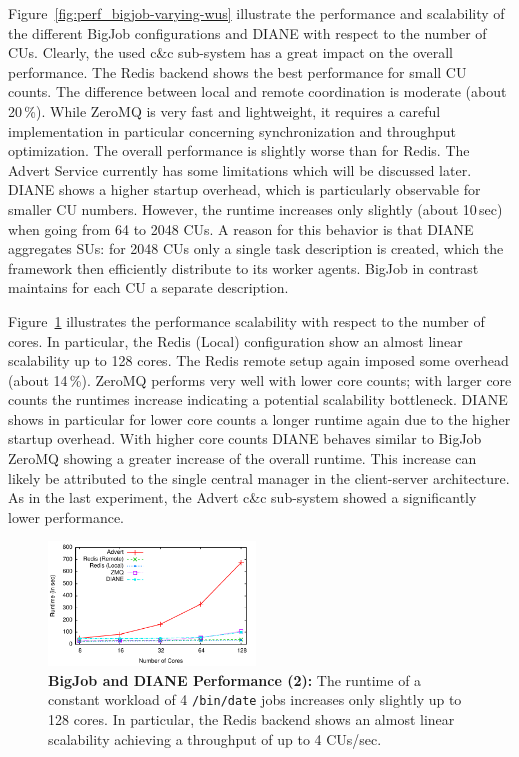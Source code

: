 \documentclass[conference,final]{IEEEtran}
\newcommand{\cu}{CU\xspace}
\newcommand{\cus}{CUs\xspace}
\newcommand{\upp}{\vspace*{-0.5em}}
\begin{document}
Figure~\ref{fig:perf_bigjob-varying-wus} illustrate the performance and
scalability of the different BigJob configurations and DIANE with respect to the
number of \cus. Clearly, the used c\&c sub-system has a great impact on the
overall performance. The Redis backend shows the best performance for small \cu 
counts. The difference between local and remote coordination is moderate (about
20\,\%). While ZeroMQ is very fast and lightweight, it requires a careful
implementation in particular concerning synchronization and throughput
optimization. The overall performance is slightly worse than for Redis. The
Advert Service currently has some limitations which will be discussed later.
DIANE shows a higher startup overhead, which is particularly observable for
smaller \cu  numbers. However, the runtime increases only slightly (about 10\,sec)
when going from 64 to 2048 \cus. A reason for this behavior is that DIANE
aggregates SUs: for 2048 \cus only a single task description is created, which
the framework then efficiently distribute to its worker agents. BigJob in
contrast maintains for each \cu  a separate description. 

Figure~\ref{fig:perf_bigjob-varying-cores} illustrates the performance
scalability with respect to the number of cores. In particular, the Redis
(Local) configuration show an almost linear scalability up to 128 cores. The
Redis remote setup again imposed some overhead (about 14\,\%). ZeroMQ performs
very well with lower core counts; with larger core counts the runtimes increase
indicating a potential scalability bottleneck. DIANE shows in particular for
lower core counts a longer runtime again due to the higher startup overhead.
With higher core counts DIANE behaves similar to BigJob ZeroMQ showing a greater
increase of the overall runtime. This increase can likely be attributed to
the single central manager in the client-server architecture. As in the last
experiment, the Advert c\&c sub-system showed a significantly lower performance.

\begin{figure}[htbp] \centering
\includegraphics[width=0.49\textwidth]{perf/bigjob-varying-cores-alamo.pdf}
\caption{\textbf{BigJob and DIANE Performance (2):}  The
runtime of a constant workload of 4 \texttt{/bin/date} jobs 
increases only slightly up to 128 cores. In particular, the Redis backend shows
an almost linear scalability achieving a throughput of up to 4 \cus/sec. }
\label{fig:perf_bigjob-varying-cores} 
\upp\upp
\end{figure}
\end{document}
